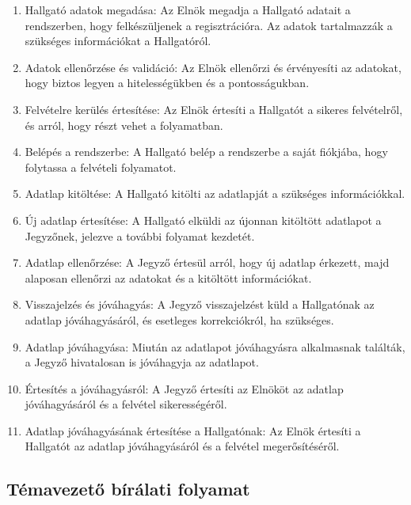 \documentclass[a4paper,12pt]{article}
\begin{document}
\begin{enumerate}
\item Hallgató adatok megadása: Az Elnök megadja a Hallgató adatait a rendszerben, hogy felkészüljenek a regisztrációra. Az adatok tartalmazzák a szükséges információkat a Hallgatóról.

\item Adatok ellenőrzése és validáció: Az Elnök ellenőrzi és érvényesíti az adatokat, hogy biztos legyen a hitelességükben és a pontosságukban.

\item Felvételre kerülés értesítése: Az Elnök értesíti a Hallgatót a sikeres felvételről, és arról, hogy részt vehet a folyamatban.

\item Belépés a rendszerbe: A Hallgató belép a rendszerbe a saját fiókjába, hogy folytassa a felvételi folyamatot.

\item Adatlap kitöltése: A Hallgató kitölti az adatlapját a szükséges információkkal.

\item Új adatlap értesítése: A Hallgató elküldi az újonnan kitöltött adatlapot a Jegyzőnek, jelezve a további folyamat kezdetét.

\item Adatlap ellenőrzése: A Jegyző értesül arról, hogy új adatlap érkezett, majd alaposan ellenőrzi az adatokat és a kitöltött információkat.

\item Visszajelzés és jóváhagyás: A Jegyző visszajelzést küld a Hallgatónak az adatlap jóváhagyásáról, és esetleges korrekciókról, ha szükséges.

\item Adatlap jóváhagyása: Miután az adatlapot jóváhagyásra alkalmasnak találták, a Jegyző hivatalosan is jóváhagyja az adatlapot.

\item Értesítés a jóváhagyásról: A Jegyző értesíti az Elnököt az adatlap jóváhagyásáról és a felvétel sikerességéről.

\item Adatlap jóváhagyásának értesítése a Hallgatónak: Az Elnök értesíti a Hallgatót az adatlap jóváhagyásáról és a felvétel megerősítéséről.
\end{enumerate}

\subsection{Témavezető bírálati folyamat}
\end{document}
